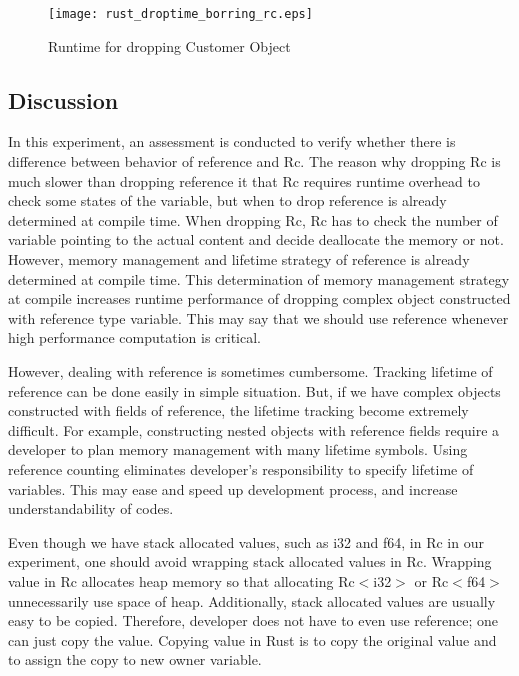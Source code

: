 \begin{figure}[htb!]
    \texttt{[image: rust\_droptime\_borring\_rc.eps]}
    \caption{Runtime for dropping Customer Object}
    \label{fig:rc_ref}
\end{figure}


\subsection{Discussion}
In this experiment, an assessment is conducted to verify whether there is difference between behavior of reference and Rc.
The reason why dropping Rc is much slower than dropping reference it that Rc requires runtime overhead to check some states of the variable, 
but when to drop reference is already determined at compile time. When dropping Rc, Rc has to check the number of variable pointing to the actual content and decide 
deallocate the memory or not. However, memory management and lifetime strategy of reference is already determined at compile time.
This determination of memory management strategy at compile increases runtime performance of dropping complex object constructed with reference type variable.
This may say that we should use reference whenever high performance computation is critical.

However, dealing with reference is sometimes cumbersome. Tracking lifetime of reference can be done easily in simple situation. 
But, if we have complex objects constructed with fields of reference, the lifetime tracking become extremely difficult. 
For example, constructing nested objects with reference fields require a developer to plan memory management with many lifetime symbols. 
Using reference counting eliminates developer's responsibility to specify lifetime of variables. 
This may ease and speed up development process, and increase understandability of codes.

Even though we have stack allocated values, such as i32 and f64, in Rc in our experiment, 
one should avoid wrapping stack allocated values in Rc. Wrapping value in Rc allocates heap memory so that allocating Rc$<$i32$>$ or Rc$<$f64$>$ unnecessarily use space of 
heap. Additionally, stack allocated values are usually easy to be copied. Therefore, developer does not have to even use reference; one can just copy the value. 
Copying value in Rust is to copy the original value and to assign the copy to new owner variable. 